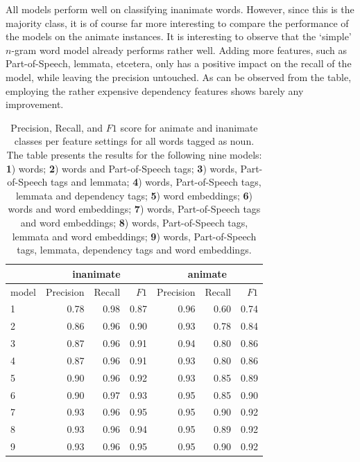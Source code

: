 All models perform well on classifying inanimate words. However, since this is the majority class, it is of course far more interesting to compare the performance of the models on the animate instances. It is interesting to observe that the `simple' $n$-gram word model already performs rather well. Adding more features, such as Part-of-Speech, lemmata, etcetera, only has a positive impact on the recall of the model, while leaving the precision untouched. As can be observed from the table, employing the rather expensive dependency features shows barely any improvement.

\begin{table}[t]
\centering
\begin{tabular}{lrrrrrr}
\toprule
                      & \multicolumn{3}{c}{inanimate} & \multicolumn{3}{c}{animate} \\ \midrule
model                 & Precision  & Recall  & $F1$ & Precision  & Recall  & $F1$  \\ \cmidrule(r){1-7}
1                     & 0.78 & 0.98 & 0.87 & 0.96 & 0.60 & 0.74 \\
2                     & 0.86 & 0.96 & 0.90 & 0.93 & 0.78 & 0.84 \\
3                     & 0.87 & 0.96 & 0.91 & 0.94 & 0.80 & 0.86 \\
4                     & 0.87 & 0.96 & 0.91 & 0.93 & 0.80 & 0.86 \\
5                     & 0.90 & 0.96 & 0.92 & 0.93 & 0.85 & 0.89 \\
6                     & 0.90 & 0.97 & 0.93 & 0.95 & 0.85 & 0.90 \\
\rowcolor{lightgray}7 & 0.93 & 0.96 & 0.95 & 0.95 & 0.90 & 0.92 \\
8                     & 0.93 & 0.96 & 0.94 & 0.95 & 0.89 & 0.92 \\
9                     & 0.93 & 0.96 & 0.95 & 0.95 & 0.90 & 0.92 \\
\bottomrule
\end{tabular}
\caption[Animacy classification results on all (proper) nouns.]{Precision, Recall, and $F1$ score for animate and inanimate classes per feature settings for all words tagged as noun. The table presents the results for the following nine models: \textbf{1}) words; \textbf{2}) words and Part-of-Speech tags; \textbf{3}) words, Part-of-Speech tags and lemmata; \textbf{4}) words, Part-of-Speech tags, lemmata and dependency tags; \textbf{5}) word embeddings; \textbf{6}) words and word embeddings; \textbf{7}) words, Part-of-Speech tags and word embeddings; \textbf{8}) words, Part-of-Speech tags, lemmata and word embeddings; \textbf{9}) words, Part-of-Speech tags, lemmata, dependency tags and word embeddings.}
\label{tab:results-noun}
\end{table}

